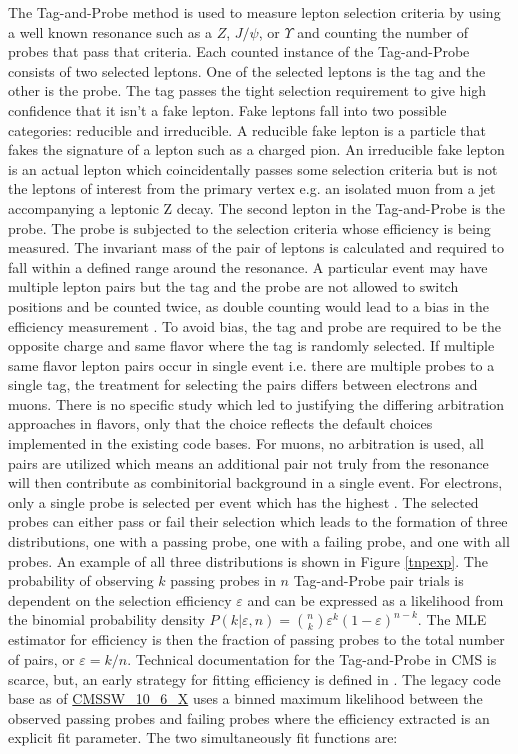 The Tag-and-Probe method is used to measure lepton selection criteria by using a well known resonance such as a $Z$, $J/\psi$, or $\Upsilon$ and counting the number of probes that pass that criteria. Each counted instance of the Tag-and-Probe consists of two selected leptons. One of the selected leptons is the tag and the other is the probe.  The tag passes the tight selection requirement to give high confidence that it isn't a fake lepton. Fake leptons fall into two possible categories: reducible and irreducible. A reducible fake lepton is a particle that fakes the signature of a lepton such as a charged pion. An irreducible fake lepton is an actual lepton which coincidentally passes some selection criteria but is not the leptons of interest from the primary vertex e.g. an isolated muon from a jet accompanying a leptonic Z decay.  The  second lepton in the Tag-and-Probe is the probe. The probe is subjected to the selection criteria whose efficiency is being measured. The invariant mass of the pair of leptons is calculated and required to fall within a defined range around the resonance. A particular event may have multiple lepton pairs but the tag and the probe are not allowed to switch positions and be counted twice, as double counting would lead to a bias in the efficiency measurement \cite{AN111-2009}. To avoid bias, the tag and probe are required to be the opposite charge and same flavor where the tag is randomly selected. If multiple same flavor lepton pairs occur in single event i.e. there are multiple probes to a single tag, the treatment for selecting the pairs differs between electrons and muons. There is no specific study which led to justifying the differing arbitration approaches in flavors, only that the choice reflects the default choices implemented in the existing code bases.  For muons, no arbitration is used, all pairs are utilized which means an additional pair not truly from the resonance will then contribute as combinitorial background in a single event. For electrons, only a single probe is selected per event which has the highest \pt. The selected probes can either pass or fail their selection which leads to the formation of three distributions, one with a passing probe, one with a failing probe, and one with all probes. An example of all three distributions is shown in Figure \ref{tnpexp}.  The probability of observing $k$ passing probes in $n$ Tag-and-Probe pair trials is dependent on the selection efficiency $\varepsilon$ and can be expressed as a likelihood from the binomial probability density $P(k|\varepsilon,n) = \binom{n}{k}\varepsilon^k(1-\varepsilon)^{n-k}$. The MLE estimator for efficiency is then the fraction of passing probes to the total number of pairs, or $\varepsilon = k/n$. Technical documentation for the Tag-and-Probe in CMS is scarce, but, an early strategy for fitting efficiency is defined in \cite{Berryhill_2010}. The legacy code base as of \url{CMSSW_10_6_X}  uses a binned maximum likelihood between the observed passing probes and failing probes where the efficiency extracted is an explicit fit parameter. The two simultaneously fit functions are:
